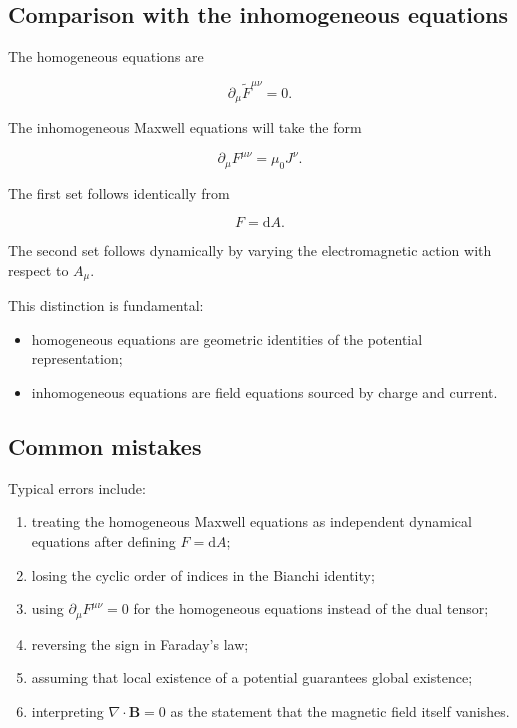 \subsection{Comparison with the inhomogeneous equations}

The homogeneous equations are

\[
\boxed{
\partial_{\mu}
\widetilde{F}^{\mu\nu}=0
}.
\]

The inhomogeneous Maxwell equations will take the form

\[
\boxed{
\partial_{\mu}F^{\mu\nu}
=
\mu_0J^{\nu}
}.
\]

The first set follows identically from

\[
F=\mathrm{d}A.
\]

The second set follows dynamically by varying the electromagnetic action with respect to \(A_{\mu}\).

This distinction is fundamental:

\begin{itemize}
    \item homogeneous equations are geometric identities of the potential representation;
    \item inhomogeneous equations are field equations sourced by charge and current.
\end{itemize}

\subsection{Common mistakes}

Typical errors include:

\begin{enumerate}
    \item treating the homogeneous Maxwell equations as independent dynamical equations after defining \(F=\mathrm{d}A\);
    \item losing the cyclic order of indices in the Bianchi identity;
    \item using \(\partial_{\mu}F^{\mu\nu}=0\) for the homogeneous equations instead of the dual tensor;
    \item reversing the sign in Faraday's law;
    \item assuming that local existence of a potential guarantees global existence;
    \item interpreting \(\nabla\cdot\mathbf{B}=0\) as the statement that the magnetic field itself vanishes.
\end{enumerate}

